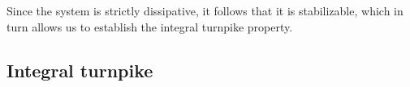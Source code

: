 \documentclass[10pt, a4]{amsart}
\makeatletter
\theoremstyle{plain}
\newtheorem{theorem}[lemma]{Theorem}
\theoremstyle{definition}
\theoremstyle{remark}
\renewenvironment{proof}[1][\proofname]{\par
  \pushQED{\qed}%
  \normalfont \topsep6\p@\@plus6\p@\relax
  \trivlist
  \item[\hskip\labelsep
        \itshape
    #1\ \ref{#1}.]\ignorespaces
}{%
  \popQED\endtrivlist\@endpefalse
}
\numberwithin{equation}{section}
\makeatother
\begin{document}
Since the system is strictly dissipative, it follows that it is stabilizable, which in turn allows us to establish the integral turnpike property.
  \subsection{Integral turnpike} 
\end{document}
